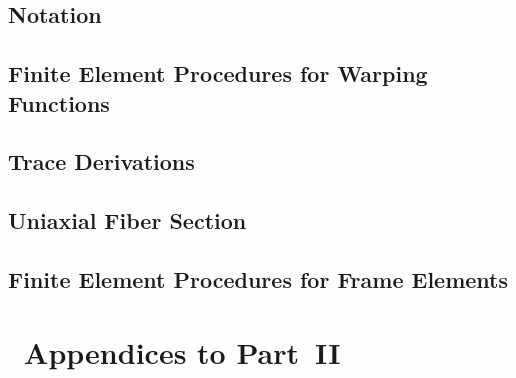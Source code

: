 \begin{Notation}[section]
\begin{appendices}
\chapter{Notation}\label{sec:notation}


\clearpage






\clearpage

\chapter{Finite Element Procedures for Warping Functions}

\clearpage 



\clearpage


\chapter{Trace Derivations}

\clearpage

\clearpage 

\chapter{Uniaxial Fiber Section}



\chapter{Finite Element Procedures for Frame Elements}\label{sec:ForceFrame}

\clearpage
% 

% 
% 

\end{appendices}

\part{~Appendices to Part~II}


\end{Notation}
